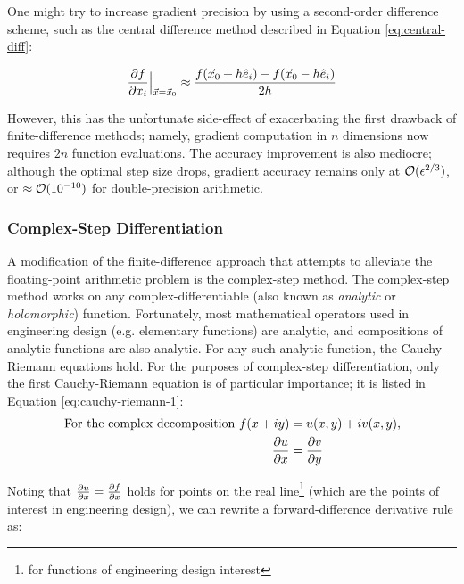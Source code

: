 One might try to increase gradient precision by using a second-order difference scheme, such as the central difference method described in Equation \ref{eq:central-diff}:

\begin{equation}
    \frac{\partial f}{\partial x_i}\Big|_{\vec{x}=\vec{x}_0} \approx \frac{f(\vec{x}_0 + h\hat{e}_i) - f(\vec{x}_0 - h\hat{e}_i)}{2h}
    \label{eq:central-diff}
\end{equation}

However, this has the unfortunate side-effect of exacerbating the first drawback of finite-difference methods; namely, gradient computation in $n$ dimensions now requires $2n$ function evaluations. The accuracy improvement is also mediocre; although the optimal step size drops, gradient accuracy remains only at $\mathcal{O}(\epsilon^{2/3})$, or $\approx \mathcal{O}(10^{-10})$ for double-precision arithmetic.

\subsubsection{Complex-Step Differentiation}

A modification of the finite-difference approach that attempts to alleviate the floating-point arithmetic problem is the complex-step method. The complex-step method works on any complex-differentiable (also known as \textit{analytic} or \textit{holomorphic}) function. Fortunately, most mathematical operators used in engineering design (e.g. elementary functions) are analytic, and compositions of analytic functions are also analytic. For any such analytic function, the Cauchy-Riemann equations hold. For the purposes of complex-step differentiation, only the first Cauchy-Riemann equation is of particular importance; it is listed in Equation \ref{eq:cauchy-riemann-1}:
\begin{equation}
    \begin{split}
        \text{For the complex decomposition } f(x+iy) &= u(x, y) + i v(x, y) \text{,}\\
        \frac{\partial u}{\partial x} &= \frac{\partial v}{\partial y}
    \end{split}
    \label{eq:cauchy-riemann-1}
\end{equation}

Noting that $\frac{\partial u}{\partial x} = \frac{\partial f}{\partial x}$ holds for points on the real line\footnote{for functions of engineering design interest} (which are the points of interest in engineering design), we can rewrite a forward-difference derivative rule as:

